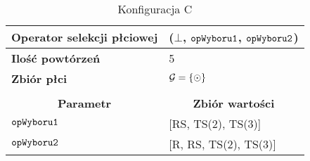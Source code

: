 \documentclass[./FM_mgr.tex]{subfiles}
\begin{document}
\begin{table}[h]
	\caption{Konfiguracja C \label{table:tsp_config_compare_c}}
	\begin{tabularx}{\linewidth}{lX}
		\hline
		\multicolumn{1}{|l|}{{\bf Operator selekcji płciowej}}        & \multicolumn{1}{l|}{\opName{stdGenSel}($\bot$, $\mathtt{opWyboru1}$, $\mathtt{opWyboru2}$)} \\ \hline
		\multicolumn{1}{|l|}{{\bf Ilość powtórzeń}} & \multicolumn{1}{l|}{5}                                                                      \\ \hline
		\multicolumn{1}{|l|}{{\bf Zbiór płci}} & \multicolumn{1}{l|}{$\mathcal{G} = \{ \odot \}$} \\  \hline
		&                                                                                             \\ \hline
		\multicolumn{1}{|c|}{{\bf Parametr}}        & \multicolumn{1}{c|}{{\bf Zbiór wartości}}                                                   \\ \hline \hline
		\multicolumn{1}{|l|}{$\mathtt{opWyboru1}$}   & \multicolumn{1}{l|}{[RS, TS(2), TS(3)]}                                                   \\ \hline
		\multicolumn{1}{|l|}{$\mathtt{opWyboru2}$}   & \multicolumn{1}{l|}{[R, RS, TS(2), TS(3)]} \\
		\hline
	\end{tabularx}
\end{table}
\end{document}
